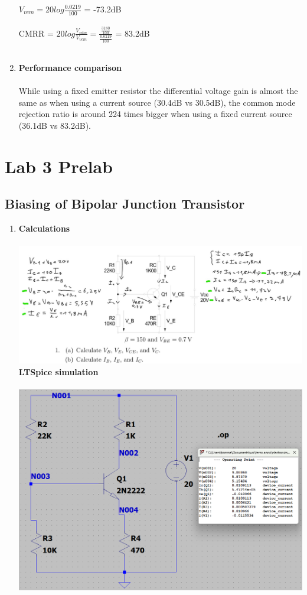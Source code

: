 \documentclass{article}
\begin{document}
\begin{enumerate}
		\(V_{vcm} = 20 log\frac{0.0219}{100}\) = -73.2dB\\\\
		CMRR = \(20log \frac{V_{vdm}}{V_{vcm}} = \frac{\frac{3180}{100}}{\frac{0.0219}{100}} \) = 83.2dB\\\\
		\item  \textbf{Performance comparison}\\\\
		While using a fixed emitter resistor the differential voltage gain is almost the same as when using a current source (30.4dB vs 30.5dB), the common mode rejection ratio is around 224 times bigger when using a fixed current source (36.1dB vs 83.2dB).   
		
	\end{enumerate}
	
	\section{Lab 3 Prelab }
	\subsection{Biasing of Bipolar Junction Transistor}
	\begin{enumerate}
		\item \textbf{Calculations}\\\\
		\includegraphics[scale=0.45]{prelab 3/prelab 3 ex 1 calc}\\
		\textbf{LTSpice simulation}\\\\
		\includegraphics[scale=0.6]{prelab 3/prelab 3 ex1 circuit}\\
	\end{enumerate}
	\pagebreak
\end{document}
